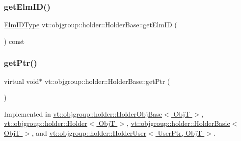 \subsubsection{\texorpdfstring{get\+Elm\+I\+D()}{getElmID()}}
{\footnotesize\ttfamily \hyperlink{structvt_1_1objgroup_1_1holder_1_1_holder_base_a89c0ce1f23237ab00aee86d4d339bc50}{Elm\+I\+D\+Type} vt\+::objgroup\+::holder\+::\+Holder\+Base\+::get\+Elm\+ID (\begin{DoxyParamCaption}{ }\end{DoxyParamCaption}) const\hspace{0.3cm}{\ttfamily [inline]}}

\mbox{\label{structvt_1_1objgroup_1_1holder_1_1_holder_base_a0b40d32b476b94586468abb5ae9a53a6}} 
\subsubsection{\texorpdfstring{get\+Ptr()}{getPtr()}}
{\footnotesize\ttfamily virtual void$\ast$ vt\+::objgroup\+::holder\+::\+Holder\+Base\+::get\+Ptr (\begin{DoxyParamCaption}{ }\end{DoxyParamCaption})\hspace{0.3cm}{\ttfamily [pure virtual]}}



Implemented in \hyperlink{structvt_1_1objgroup_1_1holder_1_1_holder_obj_base_aa08fdb3d076043c004e3674a136f84c3}{vt\+::objgroup\+::holder\+::\+Holder\+Obj\+Base$<$ Obj\+T $>$}, \hyperlink{structvt_1_1objgroup_1_1holder_1_1_holder_a856859dca0c0ee3fb6ebace444a36200}{vt\+::objgroup\+::holder\+::\+Holder$<$ Obj\+T $>$}, \hyperlink{structvt_1_1objgroup_1_1holder_1_1_holder_basic_a2a8962345709045e6d2c465b17362885}{vt\+::objgroup\+::holder\+::\+Holder\+Basic$<$ Obj\+T $>$}, and \hyperlink{structvt_1_1objgroup_1_1holder_1_1_holder_user_a92734867a29d21a7f165cbb4052717db}{vt\+::objgroup\+::holder\+::\+Holder\+User$<$ User\+Ptr, Obj\+T $>$}.

\mbox{\label{structvt_1_1objgroup_1_1holder_1_1_holder_base_ae8b3ce89d3506e442fbf674ee9aa8230}} 
